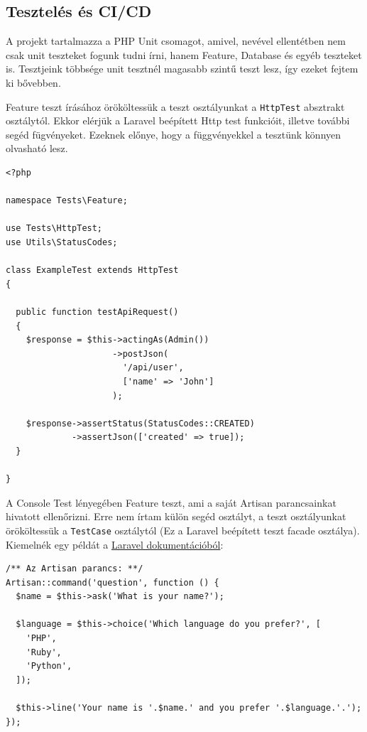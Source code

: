 \documentclass[a4paper,12pt]{thesis-ekf}
\theoremstyle{definition}
\begin{document}
		\subsection{Tesztelés és CI/CD}\label{ssc-CiCd}	
		A projekt tartalmazza a PHP Unit csomagot, amivel, nevével ellentétben nem csak unit teszteket fogunk tudni írni, hanem Feature, Database és egyéb teszteket is. Tesztjeink többsége unit tesztnél magasabb szintű teszt lesz, így ezeket fejtem ki bővebben.
		
		Feature teszt írásához örököltessük a teszt osztályunkat a \verb|HttpTest| absztrakt osztálytól. Ekkor elérjük a Laravel beépített Http test funkcióit, illetve további segéd fügvényeket. Ezeknek előnye, hogy a  függvényekkel a tesztünk könnyen olvasható lesz.
		
\begin{lstlisting}[caption={Feature teszt p\'elda},captionpos=b]
<?php

namespace Tests\Feature;

use Tests\HttpTest;
use Utils\StatusCodes;

class ExampleTest extends HttpTest
{

  public function testApiRequest()
  {
    $response = $this->actingAs(Admin())
                     ->postJson(
                       '/api/user',
                       ['name' => 'John']
                     );

    $response->assertStatus(StatusCodes::CREATED)
             ->assertJson(['created' => true]);
  }
  
}
\end{lstlisting}

		A Console Test lényegében Feature teszt, ami a saját Artisan parancsainkat hivatott ellenőrizni. Erre nem írtam külön segéd osztályt, a teszt osztályunkat örököltessük a \verb|TestCase| osztálytól (Ez a Laravel beépített teszt facade osztálya). Kiemelnék egy példát a \href{https://laravel.com/docs/9.x/console-tests#input-output-expectations}{Laravel dokumentációból}\cite{artisan-test}:
		
\begin{lstlisting}[caption={Egy p\'elda Artisan parancs},captionpos=b]
/** Az Artisan parancs: **/
Artisan::command('question', function () {
  $name = $this->ask('What is your name?');

  $language = $this->choice('Which language do you prefer?', [
    'PHP',
    'Ruby',
    'Python',
  ]);

  $this->line('Your name is '.$name.' and you prefer '.$language.'.');
});
\end{lstlisting}
\end{document}
